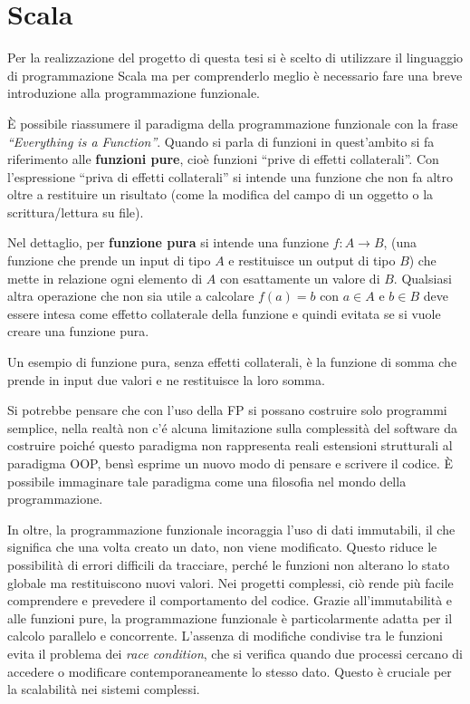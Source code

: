 \documentclass[12pt,a4paper,openright,twoside]{book}
\begin{document}
\section{Scala}

Per la realizzazione del progetto di questa tesi si è scelto di utilizzare il linguaggio di programmazione Scala ma per comprenderlo meglio è necessario fare una breve introduzione alla programmazione funzionale.

È possibile riassumere il paradigma della programmazione funzionale con la frase \textit{``Everything is a Function''}. Quando si parla di funzioni in quest'ambito si fa riferimento alle \textbf{funzioni pure}\cite{Hunt2018}, cioè funzioni ``prive di effetti collaterali''. Con l'espressione ``priva di effetti collaterali'' si intende una funzione che non fa altro oltre a restituire un risultato (come la modifica del campo di un oggetto o la scrittura/lettura su file).

\label{sec:fp}
Nel dettaglio, per \textbf{funzione pura} si intende una funzione $f:A\to B$, (una funzione che prende un input di tipo $A$ e restituisce un output di tipo $B$) che mette in relazione ogni elemento di $A$ con esattamente un valore di $B$. Qualsiasi altra operazione che non sia utile a calcolare $f(a)=b$ con $a\in A$ e $b\in B$ deve essere intesa come effetto collaterale della funzione e quindi evitata se si vuole creare una funzione pura.

Un esempio di funzione pura, senza effetti collaterali, è la funzione di somma che prende in input due valori e ne restituisce la loro somma. 

Si potrebbe pensare che con l'uso della \ac{FP} si possano costruire solo programmi semplice, nella realtà non c'é alcuna limitazione sulla complessità del software da costruire poiché questo paradigma non rappresenta reali estensioni strutturali al paradigma \ac{OOP}, bensì esprime un nuovo modo di pensare e scrivere il codice. È possibile immaginare tale paradigma come una filosofia nel mondo della programmazione.

In oltre, la programmazione funzionale incoraggia l'uso di dati immutabili, il che significa che una volta creato un dato, non viene modificato. Questo riduce le possibilità di errori difficili da tracciare, perché le funzioni non alterano lo stato globale ma restituiscono nuovi valori. Nei progetti complessi, ciò rende più facile comprendere e prevedere il comportamento del codice.  Grazie all'immutabilità e alle funzioni pure, la programmazione funzionale è particolarmente adatta per il calcolo parallelo e concorrente. L'assenza di modifiche condivise tra le funzioni evita il problema dei \textit{race condition}, che si verifica quando due processi cercano di accedere o modificare contemporaneamente lo stesso dato. Questo è cruciale per la scalabilità nei sistemi complessi.
\end{document}
